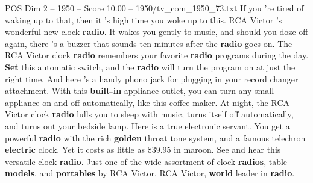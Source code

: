 \begin{textsample}{POS Dim 2 – 1950 – Score 10.00 – 1950/tv\_com\_1950\_73.txt}  \label{ex:f2_pos_001}
If you 're tired of waking up to that, then it 's high time you woke up to this.
RCA Victor 's wonderful new clock \textbf{radio}.
It wakes you gently to music, and should you doze off again, there 's a buzzer that sounds ten minutes after the \textbf{radio} goes on.
The RCA Victor clock \textbf{radio} remembers your favorite \textbf{radio} programs during the day. \textbf{Set} this automatic switch, and the \textbf{radio} will turn the program on at just the right time.
And here 's a handy phono jack for plugging in your record changer attachment.
With this \textbf{built-in} appliance outlet, you can turn any small appliance on and off automatically, like this coffee maker.
At night, the RCA Victor clock \textbf{radio} lulls you to sleep with music, turns itself off automatically, and turns out your bedside lamp.
Here is a true electronic servant.
You get a powerful \textbf{radio} with the rich \textbf{golden} throat tone system, and a famous telechron \textbf{electric} clock.
Yet it costs as little as \$39.95 in maroon.
See and hear this versatile clock \textbf{radio}.
Just one of the wide assortment of clock \textbf{radios}, table \textbf{models}, and \textbf{portables} by RCA Victor.
RCA Victor, \textbf{world} leader in \textbf{radio}.

\end{textsample}
